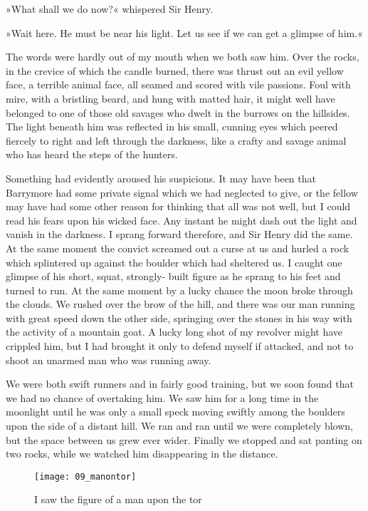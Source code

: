 »What shall we do now?« whispered Sir Henry.

»Wait here. He must be near his light. Let us see if we can get a glimpse of him.«

The words were hardly out of my mouth when we both saw him. Over the rocks, in the crevice of which the candle burned, there was thrust out an evil yellow face, a terrible animal face, all seamed and scored with vile passions. Foul with mire, with a bristling beard, and hung with matted hair, it might well have belonged to one of those old savages who dwelt in the burrows on the hillsides. The light beneath him was reflected in his small, cunning eyes which peered fiercely to right and left through the darkness, like a crafty and savage animal who has heard the steps of the hunters.

Something had evidently aroused his suspicions. It may have been that Barrymore had some private signal which we had neglected to give, or the fellow may have had some other reason for thinking that all was not well, but I could read his fears upon his wicked face. Any instant he might dash out the light and vanish in the darkness. I sprang forward therefore, and Sir Henry did the same. At the same moment the convict screamed out a curse at us and hurled a rock which splintered up against the boulder which had sheltered us. I caught one glimpse of his short, squat, strongly- built figure as he sprang to his feet and turned to run. At the same moment by a lucky chance the moon broke through the clouds. We rushed over the brow of the hill, and there was our man running with great speed down the other side, springing over the stones in his way with the activity of a mountain goat. A lucky long shot of my revolver might have crippled him, but I had brought it only to defend myself if attacked, and not to shoot an unarmed man who was running away.


We were both swift runners and in fairly good training, but we soon found that we had no chance of overtaking him. We saw him for a long time in the moonlight until he was only a small speck moving swiftly among the boulders upon the side of a distant hill. We ran and ran until we were completely blown, but the space between us grew ever wider. Finally we stopped and sat panting on two rocks, while we watched him disappearing in the distance.

\makeatletter
{}
{%
	\begin{figure}[p]
	\centering
	\texttt{[image: 09\_manontor]}
	\caption{I saw the figure of a man upon the tor}
	\end{figure}
}{%

}

